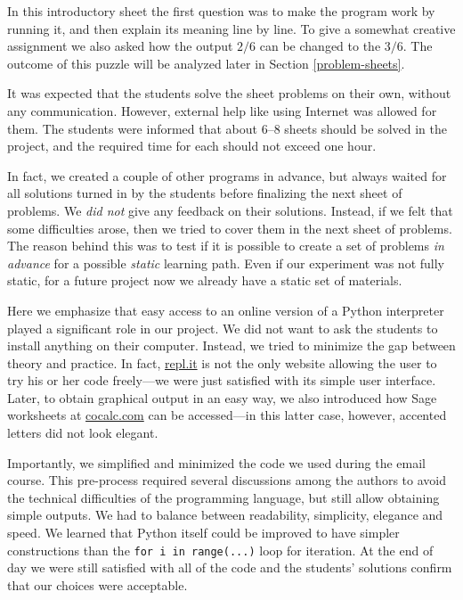 \documentclass[]{interact}
\theoremstyle{plain}%
\theoremstyle{definition}
\theoremstyle{remark}
\begin{document}
In this introductory sheet the first question was to make the program work by running it,
and then explain its meaning line by line.
To give a somewhat creative assignment we also asked how the output $2/6$ can be changed to
the $3/6$. The outcome of this puzzle will be analyzed later in Section \ref{problem-sheets}.

It was expected that the students solve the sheet problems on their own, without
any communication. However, external help like using Internet was allowed for them.
The students were informed that about 6--8 sheets should be solved in the project,
and the required time for each should not exceed one hour.

In fact, we created a couple of other programs in advance, but always waited for
all solutions turned in by the students before finalizing the next sheet of problems.
We \textit{did not} give any feedback on their solutions. Instead, if we felt that
some difficulties arose, then we tried to cover them in the next sheet of problems.
The reason behind this was to test if it is possible to create a set of problems
\textit{in advance} for a possible \textit{static} learning path. Even if our experiment
was not fully static, for a future project now we already have a static set of materials.

Here we emphasize that easy access to an online version of a Python interpreter
played a significant role in our project. We did not want to ask the students
to install anything on their computer. Instead, we tried to minimize the gap
between theory and practice. In fact, \url{repl.it} is not the only website
allowing the user to try his or her code freely---we were just
satisfied with its simple user interface. Later, to obtain graphical output in an easy way, we also
introduced how Sage worksheets at \url{cocalc.com} can be accessed---in this latter case,
however, accented letters did not look elegant.

Importantly, we simplified and minimized the code we used during the email course.
This pre-process required several discussions among the authors to avoid
the technical difficulties of the programming language, but still allow
obtaining simple outputs. We had to balance between readability, simplicity,
elegance and speed. We learned that Python itself could be improved to
have simpler constructions than the \texttt{for i in range(...)} loop for iteration.
At the end of day we were still satisfied with all of the code and the students'
solutions confirm that our choices were acceptable.
\end{document}
